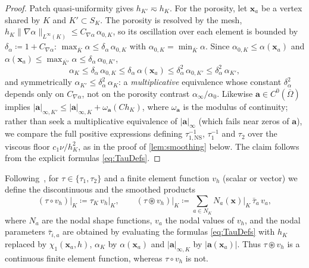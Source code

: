 \documentclass[11pt]{article}
\theoremstyle{remark}
\newcommand{\ba}{\boldsymbol{a}}
\newcommand{\norm}[1]{\lVert #1 \rVert}
\newcommand{\tns}{\tau_{1,\mathrm{NS}}}
\newcommand{\smul}{\circledast}
\newcommand{\pmul}{\circ}
\begin{document}
\begin{proof}
Patch quasi-uniformity gives $h_{K'} \eqsim h_K$. For the porosity, let $\boldsymbol{x}_a$ be a
vertex shared by $K$ and $K' \subset S_K$. The porosity is resolved by the mesh,
$h_K\norm{\nabla\alpha}_{L^\infty(K)} \le C_{\nabla\alpha}\,\alpha_{0,K}$, so its oscillation over each
element is bounded by $\delta_\alpha \coloneqq 1 + C_{\nabla\alpha}$: $\max_{\overline{K}}\alpha \le
\delta_\alpha\,\alpha_{0,K}$ with $\alpha_{0,K}=\min_{\overline{K}}\alpha$. Since
$\alpha_{0,K}\le\alpha(\boldsymbol{x}_a)$ and $\alpha(\boldsymbol{x}_a)\le\max_{\overline{K'}}\alpha\le\delta_\alpha\,\alpha_{0,K'}$,
\begin{equation*}
  \alpha_K \le \delta_\alpha\,\alpha_{0,K} \le \delta_\alpha\,\alpha(\boldsymbol{x}_a)
  \le \delta_\alpha^{2}\,\alpha_{0,K'} \le \delta_\alpha^{2}\,\alpha_{K'},
\end{equation*}
and symmetrically $\alpha_{K'}\le\delta_\alpha^{2}\,\alpha_K$: a \emph{multiplicative} equivalence whose
constant $\delta_\alpha^{2}$ depends only on $C_{\nabla\alpha}$, not on the porosity contrast
$\alpha_\infty/\alpha_0$. Likewise $\ba \in C^0(\overline\Omega)$ implies $|\ba|_{\infty,K'} \le
|\ba|_{\infty,K} + \omega_{\ba}(Ch_K)$, where $\omega_{\ba}$ is the modulus of continuity; rather than
seek a multiplicative equivalence of $|\ba|_\infty$ (which fails near zeros of $\ba$), we compare the
full positive expressions defining $\tns^{-1}$, $\tau_1^{-1}$ and $\tau_2$ over the viscous floor
$c_1\nu/h_K^2$, as in the proof of \cref{lem:smoothing} below. The claim follows from the explicit
formulas \cref{eq:TauDefs}.
\end{proof}

Following~\cite{Codina2008}, for $\tau \in \{\tau_1, \tau_2\}$ and a finite element
function $v_h$ (scalar or vector) we define the discontinuous and the smoothed
products
\begin{equation}
  \label{eq:SmulDef}
  (\tau \pmul v_h)\big|_K \coloneqq \tau_{K}\, v_h\big|_K,
  \qquad
  (\tau \smul v_h)\big|_K \coloneqq \sum_{a \in N_K} N_a(\boldsymbol{x})\big|_K\,
  \bar\tau_{a}\, v_a,
\end{equation}
where $N_a$ are the nodal shape functions, $v_a$ the nodal values of $v_h$, and the
nodal parameters $\bar\tau_{i,a}$ are obtained by evaluating the formulas
\cref{eq:TauDefs} with $h_K$ replaced by $\chi_1(\boldsymbol{x}_a, h)$,
$\alpha_K$ by $\alpha(\boldsymbol{x}_a)$ and $|\ba|_{\infty,K}$ by
$|\ba(\boldsymbol{x}_a)|$. Thus $\tau \smul v_h$ is a continuous finite element
function, whereas $\tau \pmul v_h$ is not.
\end{document}
